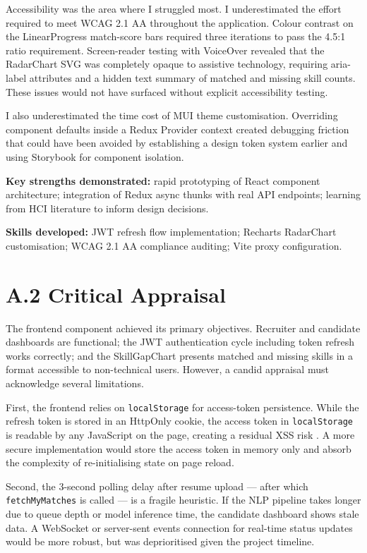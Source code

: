 Accessibility was the area where I struggled most. I underestimated the effort required to meet WCAG 2.1 AA throughout the application. Colour contrast on the LinearProgress match-score bars required three iterations to pass the 4.5:1 ratio requirement. Screen-reader testing with VoiceOver revealed that the RadarChart SVG was completely opaque to assistive technology, requiring aria-label attributes and a hidden text summary of matched and missing skill counts. These issues would not have surfaced without explicit accessibility testing.

I also underestimated the time cost of MUI theme customisation. Overriding component defaults inside a Redux Provider context created debugging friction that could have been avoided by establishing a design token system earlier and using Storybook for component isolation.

\textbf{Key strengths demonstrated:} rapid prototyping of React component architecture; integration of Redux async thunks with real API endpoints; learning from HCI literature to inform design decisions.

\textbf{Skills developed:} JWT refresh flow implementation; Recharts RadarChart customisation; WCAG 2.1 AA compliance auditing; Vite proxy configuration.

\section*{A.2 Critical Appraisal}

The frontend component achieved its primary objectives. Recruiter and candidate dashboards are functional; the JWT authentication cycle including token refresh works correctly; and the SkillGapChart presents matched and missing skills in a format accessible to non-technical users. However, a candid appraisal must acknowledge several limitations.

First, the frontend relies on \texttt{localStorage} for access-token persistence. While the refresh token is stored in an HttpOnly cookie, the access token in \texttt{localStorage} is readable by any JavaScript on the page, creating a residual XSS risk \citep{OWASP2021}. A more secure implementation would store the access token in memory only and absorb the complexity of re-initialising state on page reload.

Second, the 3-second polling delay after resume upload --- after which \texttt{fetchMyMatches} is called --- is a fragile heuristic. If the NLP pipeline takes longer due to queue depth or model inference time, the candidate dashboard shows stale data. A WebSocket or server-sent events connection for real-time status updates would be more robust, but was deprioritised given the project timeline.

